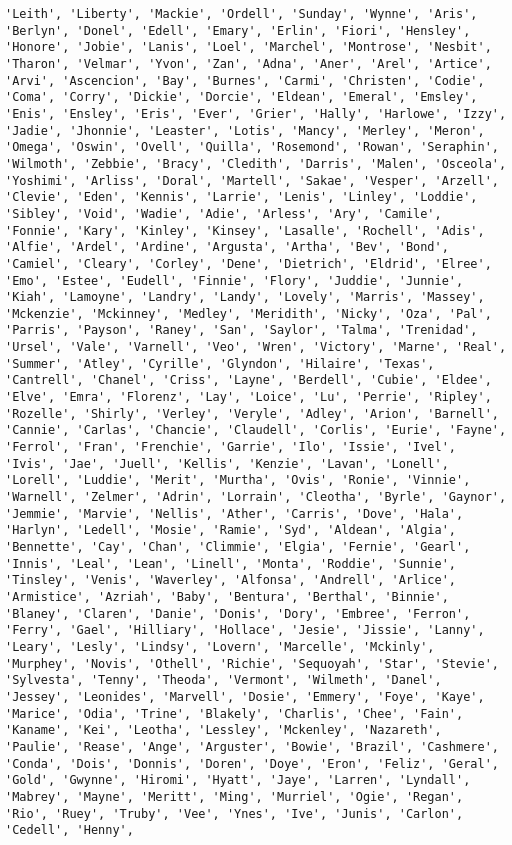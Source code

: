 \documentclass[11pt]{article}
\begin{document}
\begin{Verbatim}[commandchars=\\\{\}]
'Leith', 'Liberty', 'Mackie', 'Ordell', 'Sunday', 'Wynne', 'Aris', 'Berlyn', 'Donel', 'Edell', 'Emary', 'Erlin', 'Fiori', 'Hensley', 'Honore', 'Jobie', 'Lanis', 'Loel', 'Marchel', 'Montrose', 'Nesbit', 'Tharon', 'Velmar', 'Yvon', 'Zan', 'Adna', 'Aner', 'Arel', 'Artice', 'Arvi', 'Ascencion', 'Bay', 'Burnes', 'Carmi', 'Christen', 'Codie', 'Coma', 'Corry', 'Dickie', 'Dorcie', 'Eldean', 'Emeral', 'Emsley', 'Enis', 'Ensley', 'Eris', 'Ever', 'Grier', 'Hally', 'Harlowe', 'Izzy', 'Jadie', 'Jhonnie', 'Leaster', 'Lotis', 'Mancy', 'Merley', 'Meron', 'Omega', 'Oswin', 'Ovell', 'Quilla', 'Rosemond', 'Rowan', 'Seraphin', 'Wilmoth', 'Zebbie', 'Bracy', 'Cledith', 'Darris', 'Malen', 'Osceola', 'Yoshimi', 'Arliss', 'Doral', 'Martell', 'Sakae', 'Vesper', 'Arzell', 'Clevie', 'Eden', 'Kennis', 'Larrie', 'Lenis', 'Linley', 'Loddie', 'Sibley', 'Void', 'Wadie', 'Adie', 'Arless', 'Ary', 'Camile', 'Fonnie', 'Kary', 'Kinley', 'Kinsey', 'Lasalle', 'Rochell', 'Adis', 'Alfie', 'Ardel', 'Ardine', 'Argusta', 'Artha', 'Bev', 'Bond', 'Camiel', 'Cleary', 'Corley', 'Dene', 'Dietrich', 'Eldrid', 'Elree', 'Emo', 'Estee', 'Eudell', 'Finnie', 'Flory', 'Juddie', 'Junnie', 'Kiah', 'Lamoyne', 'Landry', 'Landy', 'Lovely', 'Marris', 'Massey', 'Mckenzie', 'Mckinney', 'Medley', 'Meridith', 'Nicky', 'Oza', 'Pal', 'Parris', 'Payson', 'Raney', 'San', 'Saylor', 'Talma', 'Trenidad', 'Ursel', 'Vale', 'Varnell', 'Veo', 'Wren', 'Victory', 'Marne', 'Real', 'Summer', 'Atley', 'Cyrille', 'Glyndon', 'Hilaire', 'Texas', 'Cantrell', 'Chanel', 'Criss', 'Layne', 'Berdell', 'Cubie', 'Eldee', 'Elve', 'Emra', 'Florenz', 'Lay', 'Loice', 'Lu', 'Perrie', 'Ripley', 'Rozelle', 'Shirly', 'Verley', 'Veryle', 'Adley', 'Arion', 'Barnell', 'Cannie', 'Carlas', 'Chancie', 'Claudell', 'Corlis', 'Eurie', 'Fayne', 'Ferrol', 'Fran', 'Frenchie', 'Garrie', 'Ilo', 'Issie', 'Ivel', 'Ivis', 'Jae', 'Juell', 'Kellis', 'Kenzie', 'Lavan', 'Lonell', 'Lorell', 'Luddie', 'Merit', 'Murtha', 'Ovis', 'Ronie', 'Vinnie', 'Warnell', 'Zelmer', 'Adrin', 'Lorrain', 'Cleotha', 'Byrle', 'Gaynor', 'Jemmie', 'Marvie', 'Nellis', 'Ather', 'Carris', 'Dove', 'Hala', 'Harlyn', 'Ledell', 'Mosie', 'Ramie', 'Syd', 'Aldean', 'Algia', 'Bennette', 'Cay', 'Chan', 'Climmie', 'Elgia', 'Fernie', 'Gearl', 'Innis', 'Leal', 'Lean', 'Linell', 'Monta', 'Roddie', 'Sunnie', 'Tinsley', 'Venis', 'Waverley', 'Alfonsa', 'Andrell', 'Arlice', 'Armistice', 'Azriah', 'Baby', 'Bentura', 'Berthal', 'Binnie', 'Blaney', 'Claren', 'Danie', 'Donis', 'Dory', 'Embree', 'Ferron', 'Ferry', 'Gael', 'Hilliary', 'Hollace', 'Jesie', 'Jissie', 'Lanny', 'Leary', 'Lesly', 'Lindsy', 'Lovern', 'Marcelle', 'Mckinly', 'Murphey', 'Novis', 'Othell', 'Richie', 'Sequoyah', 'Star', 'Stevie', 'Sylvesta', 'Tenny', 'Theoda', 'Vermont', 'Wilmeth', 'Danel', 'Jessey', 'Leonides', 'Marvell', 'Dosie', 'Emmery', 'Foye', 'Kaye', 'Marice', 'Odia', 'Trine', 'Blakely', 'Charlis', 'Chee', 'Fain', 'Kaname', 'Kei', 'Leotha', 'Lessley', 'Mckenley', 'Nazareth', 'Paulie', 'Rease', 'Ange', 'Arguster', 'Bowie', 'Brazil', 'Cashmere', 'Conda', 'Dois', 'Donnis', 'Doren', 'Doye', 'Eron', 'Feliz', 'Geral', 'Gold', 'Gwynne', 'Hiromi', 'Hyatt', 'Jaye', 'Larren', 'Lyndall', 'Mabrey', 'Mayne', 'Meritt', 'Ming', 'Murriel', 'Ogie', 'Regan', 'Rio', 'Ruey', 'Truby', 'Vee', 'Ynes', 'Ive', 'Junis', 'Carlon', 'Cedell', 'Henny', 
\end{Verbatim}
\end{document}
